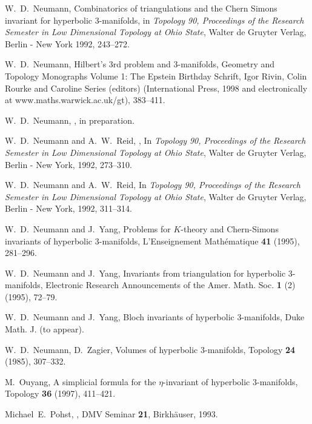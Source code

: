 \documentclass[a4paper]{amsart}
\theoremstyle{definition}
\begin{document}
\begin{thebibliography}{99}
W.~D.~Neumann,  
\newblock Combinatorics of triangulations and the Chern
Simons invariant for hyperbolic 3-manifolds,
\newblock  in {\it Topology 90,
Proceedings of the Research Semester in Low Dimensional Topology at
Ohio State}, Walter de Gruyter Verlag, Berlin - New York 1992,
243--272.

W.~D.~Neumann,
\newblock Hilbert's 3rd problem and 3-manifolds,
\newblock Geometry and Topology Monographs Volume 1: The Epstein Birthday
Schrift, Igor Rivin, Colin Rourke and Caroline Series (editors)
(International Press, 1998 and electronically at
www.maths.warwick.ac.uk/gt), 383--411.

W.~D.~Neumann,
,
\newblock in preparation.

W.~D.~Neumann and A.~W.~Reid,
,
\newblock In {\em Topology 90, Proceedings of the Research Semester in Low
  Dimensional Topology at Ohio State},  Walter de Gruyter Verlag,
  Berlin - New York, 1992, 273--310.

W.~D.~Neumann and A.~W.~Reid,
\newblock In {\em Topology 90, Proceedings of the Research Semester in Low
  Dimensional Topology at Ohio State},  Walter de Gruyter Verlag,
  Berlin - New York, 1992, 311--314.

 W.~D.~Neumann and J.~Yang,
\newblock  Problems for
$K$-theory and Chern-Simons invariants of hyperbolic 3-manifolds,
\newblock L'Enseignement Math\-\'em\-at\-ique {\bf41} (1995), 281--296.

W.~D.~Neumann and J.~Yang,
\newblock  Invariants from triangulation for
hyperbolic 3-manifolds,
\newblock  Electronic Research Announcements of the
Amer. Math. Soc. {\bf1} (2) (1995), 72--79.

W.~D.~Neumann and J.~Yang,
\newblock  Bloch invariants of hyperbolic 3-manifolds,
\newblock Duke Math. J. (to appear).

W.~D.~Neumann, D.~Zagier,  Volumes of hyperbolic 3-manifolds,
Topology {\bf24} (1985), 307--332.

M.~Ouyang, 
\newblock A simplicial formula for the $\eta$-invariant 
of hyperbolic $3$-manifolds, 
\newblock Topology {\bf36} (1997), 411--421.

Michael~E.~Pohst,
, { DMV
  Seminar} {\bf 21}, 
\newblock Birkh{\"{a}}user, 1993.


\end{thebibliography}
\end{document}
